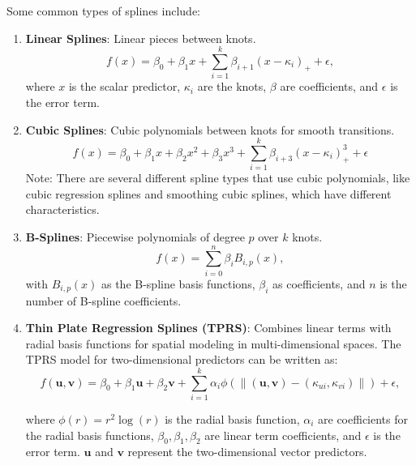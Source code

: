 \documentclass[12pt, twoside,hidelinks]{article}
\theoremstyle{definition}
\numberwithin{equation}{section}
\begin{document}
Some common types of splines include:
\begin{enumerate}
    \item \textbf{Linear Splines}: 
    Linear pieces between knots.
    \begin{equation}
        f(x) = \beta_0 + \beta_1 x + \sum_{i=1}^{k} \beta_{i+1} (x - \kappa_i)_+ + \epsilon,
        \label{eq:linear_splines}
    \end{equation}
    where \( x \) is the scalar predictor, \( \kappa_i \) are the knots, \( \beta \) are coefficients, and \( \epsilon \) is the error term.

    \item \textbf{Cubic Splines}: 
    Cubic polynomials between knots for smooth transitions.
    \begin{equation}
        f(x) = \beta_0 + \beta_1 x + \beta_2 x^2 + \beta_3 x^3 + \sum_{i=1}^{k} \beta_{i+3} (x - \kappa_i)_+^3 + \epsilon
        \label{eq:cubic_splines}
    \end{equation}
    Note: There are several different spline types that use cubic polynomials, like cubic regression splines and smoothing cubic splines, which have different characteristics.
    
    \item \textbf{B-Splines}:
    Piecewise polynomials of degree \( p \) over \( k \) knots.
    \begin{equation}
         f(x) = \sum_{i=0}^{n} \beta_i B_{i,p}(x),
         \label{eq:B_splines}
    \end{equation}
    with \( B_{i,p}(x) \) as the B-spline basis functions, \( \beta_i \) as coefficients, and \( n \) is the number of B-spline coefficients.

    \item \textbf{Thin Plate Regression Splines (TPRS)}:
    Combines linear terms with radial basis functions for spatial modeling in multi-dimensional spaces. The TPRS model for two-dimensional predictors can be written as:
    \begin{equation}
       f(\boldsymbol{u}, \boldsymbol{v}) = \beta_0 + \beta_1 \boldsymbol{u} + \beta_2 \boldsymbol{v} + \sum_{i=1}^{k} \alpha_i \phi(\| (\boldsymbol{u}, \boldsymbol{v}) - (\kappa_{ui}, \kappa_{vi}) \|) + \epsilon,
       \label{eq:tprs_splines}
    \end{equation}
    
    
    where \( \phi(r) = r^2 \log(r) \) is the radial basis function, \( \alpha_i \) are coefficients for the radial basis functions, \( \beta_0, \beta_1, \beta_2 \) are linear term coefficients, and \( \epsilon \) is the error term. \( \boldsymbol{u} \) and \( \boldsymbol{v} \) represent the two-dimensional vector predictors.

\end{enumerate}
\end{document}
